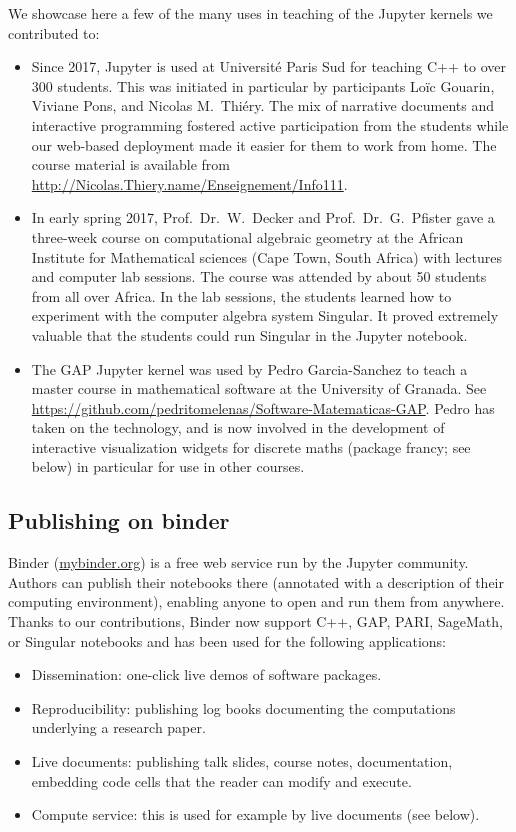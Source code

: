 \documentclass{deliverablereport}
\begin{document}
We showcase here a few of the many uses in teaching of the Jupyter
kernels we contributed to:
\begin{itemize}
\item Since 2017, Jupyter is used at Université Paris Sud for teaching C++ to over 300 students.
This was initiated in particular by \ODK participants Loïc Gouarin, Viviane Pons, and Nicolas M.\ Thiéry.
The mix of narrative documents and interactive programming fostered active participation from the students
while our web-based deployment made it easier for them to work from home.
The course material is available from \url{http://Nicolas.Thiery.name/Enseignement/Info111}.

\item In early spring 2017, Prof.~Dr.~W.~Decker and Prof.~Dr.~G.~Pfister gave a
three-week course on computational algebraic geometry at the
African Institute for Mathematical sciences (Cape Town, South Africa)
with lectures and computer lab sessions.
The course was attended by about 50 students from all over Africa.
In the lab sessions, the students learned how to experiment with the computer algebra system Singular.
It proved extremely valuable that the students could run Singular in the Jupyter notebook.

\item The GAP Jupyter kernel was used by Pedro Garcia-Sanchez to teach
  a master course in mathematical software at the University of
  Granada. See
  \url{https://github.com/pedritomelenas/Software-Matematicas-GAP}.
  Pedro has taken on the technology, and is now involved in the
  development of interactive visualization widgets for discrete maths
  (package francy; see below) in particular for use in other courses.
\end{itemize}

\subsection{Publishing on binder}

Binder (\url{mybinder.org}) is a free web service run by the Jupyter community.
Authors can publish their notebooks there (annotated with a description of their computing environment),
enabling anyone to open and run them from anywhere.
Thanks to our contributions, Binder now support C++, GAP, PARI,
SageMath, or Singular notebooks and has been used for the following
applications:

\begin{itemize}
\item Dissemination: one-click live demos of software packages.
\item Reproducibility: publishing log books documenting the computations underlying a research paper.
\item Live documents: publishing talk slides, course notes, documentation,
      embedding code cells that the reader can modify and execute.
\item Compute service: this is used for example by live documents (see below).
\end{itemize}
\end{document}
